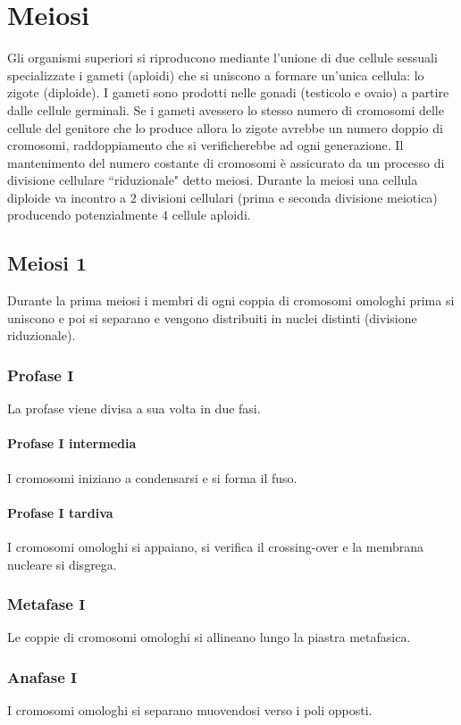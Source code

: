 \section{Meiosi}
Gli organismi superiori si riproducono mediante l'unione di due cellule sessuali specializzate i gameti (aploidi) che si uniscono a formare un'unica cellula: lo zigote (diploide). I 
gameti sono prodotti nelle gonadi (testicolo e ovaio) a partire dalle cellule germinali. Se i gameti avessero lo stesso numero di cromosomi delle cellule del genitore che lo produce 
allora lo zigote avrebbe un numero doppio di cromosomi, raddoppiamento che si verificherebbe ad ogni generazione. Il mantenimento del numero costante di cromosomi \`e assicurato da
un processo di divisione cellulare ``riduzionale" detto meiosi. Durante la meiosi una cellula diploide va incontro a $2$ divisioni cellulari (prima e seconda divisione meiotica) 
producendo potenzialmente $4$ cellule aploidi.
\subsection{Meiosi $\mathbf{1}$}
Durante la prima meiosi i membri di ogni coppia di cromosomi omologhi prima si uniscono e poi si separano e vengono distribuiti in nuclei distinti (divisione riduzionale). 
\subsubsection{Profase $\mathbf{I}$}
La profase viene divisa a sua volta in due fasi.
\paragraph{Profase $\mathbf{I}$ intermedia}
I cromosomi iniziano a condensarsi e si forma il fuso. 
\paragraph{Profase $\mathbf{I}$ tardiva}
I cromosomi omologhi si appaiano, si verifica il crossing-over e la membrana nucleare si disgrega.
\subsubsection{Metafase $\mathbf{I}$}
Le coppie di cromosomi omologhi si allineano lungo la piastra metafasica.
\subsubsection{Anafase $\mathbf{I}$}
I cromosomi omologhi si separano muovendosi verso i poli opposti. 
